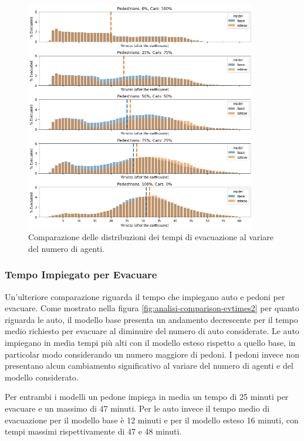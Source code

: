 \begin{figure}[ht]
    \centering
    \includegraphics[width=0.9\textwidth]{images/analisi/comparison-evtimes.png}
    \caption{Comparazione delle distribuzioni dei tempi di evacuazione al variare del numero di agenti.}
    \label{fig:analisi-comparison-evtimes}
\end{figure}


\subsubsection*{Tempo Impiegato per Evacuare}
Un'ulteriore comparazione riguarda il tempo che impiegano auto e pedoni per evacuare.
Come mostrato nella figura \ref{fig:analisi-comparison-evtimes2} per quanto riguarda le auto,
il modello base presenta un andamento decrescente per il tempo medio richiesto per evacuare al diminuire del numero di auto considerate.
Le auto impiegano in media tempi più alti con il modello esteso rispetto a quello base, in particolar modo considerando un numero maggiore di pedoni.
%
I pedoni invece non presentano alcun cambiamento significativo al variare del numero di agenti e del modello considerato.

Per entrambi i modelli un pedone impiega in media un tempo di 25 minuti per evacuare e un massimo di 47 minuti.
Per le auto invece il tempo medio di evacuazione per il modello base è 12 minuti e per il modello esteso 16 minuti,
con tempi massimi rispettivamente di 47 e 48 minuti.

